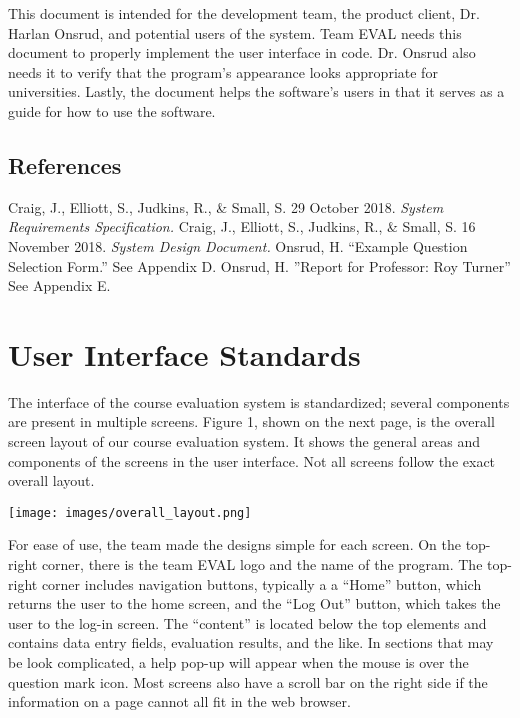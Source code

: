\documentclass{article}
\begin{document}
This document is intended for the development team, the product client, Dr. Harlan Onsrud, and potential users of the system. Team EVAL needs this document to properly implement the user interface in code. Dr. Onsrud also needs it to verify that the program's appearance looks appropriate for universities. Lastly, the document helps the software's users in that it serves as a guide for how to use the software.


\subsection{References}

Craig, J., Elliott, S., Judkins, R., \& Small, S. 29 October 2018. \textit{System Requirements Specification.}
\vspace{3mm}\newline
Craig, J., Elliott, S., Judkins, R., \& Small, S. 16 November 2018. \textit{System Design Document.}
\vspace{3mm}\newline
Onsrud, H. ``Example Question Selection Form.'' See Appendix D.
\vspace{3mm}\newline
Onsrud, H. ''Report for Professor: Roy Turner'' See Appendix E.

\section{User Interface Standards}

The interface of the course evaluation system is standardized; several components are present in multiple screens. Figure 1, shown on the next page, is the overall screen layout of our course evaluation system. It shows the general areas and components of the screens in the user interface. Not all screens follow the exact overall layout.

\newpage

\begin{center}
\vspace{3mm}
{\texttt{[image: images/overall\_layout.png]}}
\vspace{2mm}
\end{center}

For ease of use, the team made the designs simple for each screen. On the top-right corner, there is the team EVAL logo and the name of the program. The top-right corner includes navigation buttons, typically a a ``Home'' button, which returns the user to the home screen, and the ``Log Out'' button, which takes the user to the log-in screen. The ``content'' is located below the top elements and contains data entry fields, evaluation results, and the like. In sections that may be look complicated, a help pop-up will appear when the mouse is over the question mark icon. Most screens also have a scroll bar on the right side if the information on a page cannot all fit in the web browser.
\end{document}
